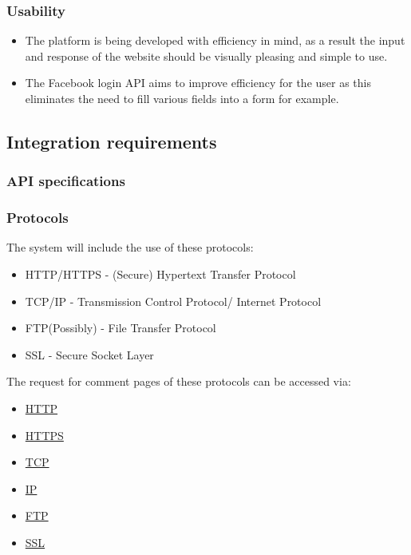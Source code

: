 \documentclass{article}
\begin{document}
		\subsubsection{Usability}
		\begin{itemize}
			\item The platform is being developed with efficiency in mind, as a result the input and response of the website should be visually pleasing and simple to use.
			\item The Facebook login API aims to improve efficiency for the user as this eliminates the need to fill various fields into a form for example.
		\end{itemize}
		 

	\subsection{Integration requirements}
		\subsubsection{API specifications}	
		\subsubsection{Protocols}
		The system will include the use of these protocols:
		\begin{itemize}
			\item HTTP/HTTPS - (Secure) Hypertext Transfer Protocol
			\item TCP/IP - Transmission Control Protocol/ Internet Protocol
			\item FTP(Possibly) - File Transfer Protocol
			\item SSL - Secure Socket Layer 
		\end{itemize}
		The request for comment pages of these protocols can be accessed via:
		\begin{itemize}
			\item\href{https://tools.ietf.org/html/rfc2616}{HTTP}
			\item\href{https://tools.ietf.org/html/rfc2660}{HTTPS}
			\item\href{https://www.ietf.org/rfc/rfc793.txt}{TCP}
			\item\href{http://www.ietf.org/rfc/rfc0791.txt}{IP}
			\item\href{https://www.ietf.org/rfc/rfc959.txt}{FTP}
			\item\href{https://tools.ietf.org/html/rfc6101}{SSL}
		\end{itemize}
\end{document}
